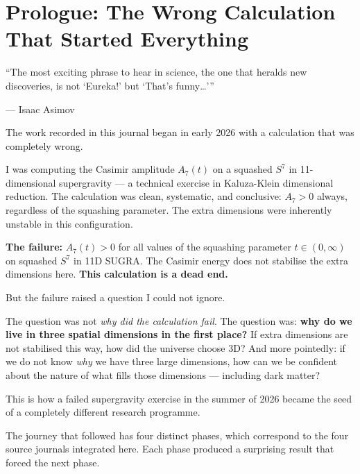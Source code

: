 \documentclass[12pt, a4paper]{article}
\begin{document}
\newpage

\tableofcontents
\newpage

\section*{Prologue: The Wrong Calculation That Started Everything}

\epigraph{``The most exciting phrase to hear in science, the one that heralds new discoveries, is not `Eureka!' but `That's funny\ldots'''}{--- Isaac Asimov}

The work recorded in this journal began in early 2026 with a calculation that was completely wrong.

I was computing the Casimir amplitude $A_7(t)$ on a squashed $S^7$ in 11-dimensional supergravity --- a technical exercise in Kaluza-Klein dimensional reduction. The calculation was clean, systematic, and conclusive: $A_7 > 0$ always, regardless of the squashing parameter. The extra dimensions were inherently unstable in this configuration.

\begin{failbox}
\textbf{The failure:} $A_7(t) > 0$ for all values of the squashing parameter $t \in (0, \infty)$ on squashed $S^7$ in 11D SUGRA. The Casimir energy does not stabilise the extra dimensions here. \textbf{This calculation is a dead end.}
\end{failbox}

But the failure raised a question I could not ignore.

The question was not \emph{why did the calculation fail}. The question was: \textbf{why do we live in three spatial dimensions in the first place?} If extra dimensions are not stabilised this way, how did the universe choose 3D? And more pointedly: if we do not know \emph{why} we have three large dimensions, how can we be confident about the nature of what fills those dimensions --- including dark matter?

This is how a failed supergravity exercise in the summer of 2026 became the seed of a completely different research programme.

\medskip
\noindent The journey that followed has four distinct phases, which correspond to the four source journals integrated here. Each phase produced a surprising result that forced the next phase.
\end{document}
